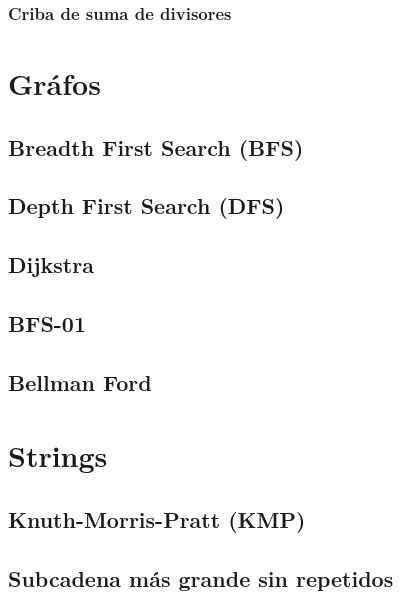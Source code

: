 \subsubsection{Criba de suma de divisores}

\section{Gráfos}

\subsection{Breadth First Search (BFS)}

\subsection{Depth First Search (DFS)}

\subsection{Dijkstra}

\subsection{BFS-01}

\subsection{Bellman Ford}

\section{Strings}

\subsection{Knuth-Morris-Pratt (KMP)}

\subsection{Subcadena más grande sin repetidos}

